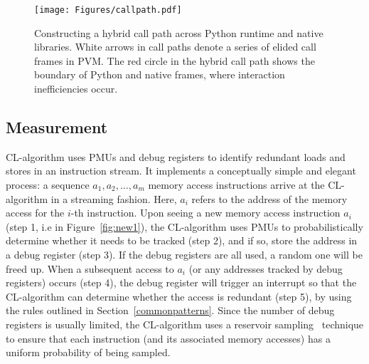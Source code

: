 \begin{figure*}[th]
	\centering
	\texttt{[image: Figures/callpath.pdf]}
	\caption{Constructing a hybrid call path across Python runtime and native libraries. White arrows in call paths denote a series of elided call frames in PVM. The red circle in the hybrid call path shows the boundary of Python and native frames, where interaction inefficiencies occur.}
	\label{fig:callpath}
\end{figure*}


\subsection{Measurement}
\label{measurement}
CL-algorithm uses PMUs and debug registers to identify redundant loads and stores in an instruction stream. It implements a conceptually simple and elegant process: a sequence $a_1, a_2, \dots , a_m$ memory access instructions arrive at the CL-algorithm in a streaming fashion. Here, $a_i$ refers to the address of the memory access for the $i$-th instruction. Upon seeing a new memory access instruction $a_i$ (step 1, i.e  in Figure~\ref{fig:new1}), the CL-algorithm uses PMUs to probabilistically determine whether it needs to be tracked (step 2), and if so, store the address in a debug register (step 3). If the debug registers are all used, a random one will be freed up. When a subsequent access to $a_i$ (or any addresses tracked by debug registers) occurs (step 4), the debug register will trigger an interrupt so that the CL-algorithm can determine whether the access is redundant (step 5), by using the rules outlined in 
Section~\ref{commonpatterns}. Since the number of debug registers is usually limited, the CL-algorithm uses a reservoir sampling~\cite{vitter1985random} technique to ensure that each instruction (and its associated memory accesses) has a uniform probability of being sampled.






